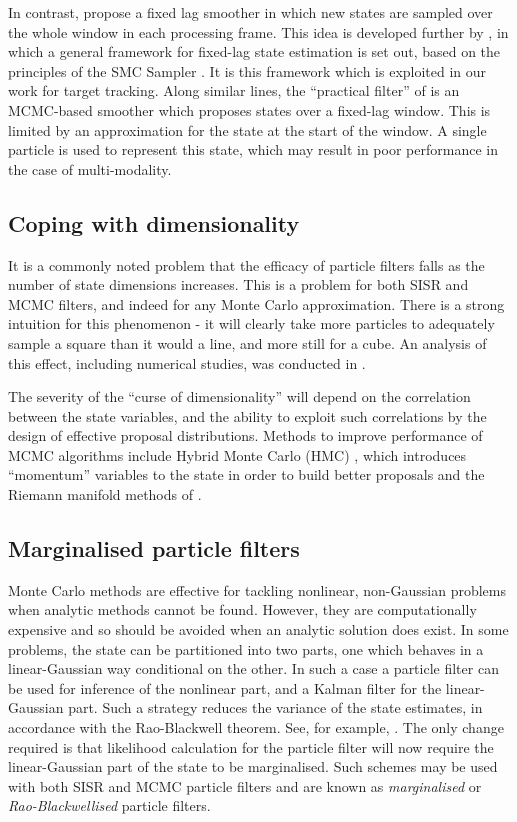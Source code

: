 In contrast, \cite{Pitt2001} propose a fixed lag smoother in which new states are sampled over the whole window in each processing frame. This idea is developed further by \cite{Doucet2006}, in which a general framework for fixed-lag state estimation is set out, based on the principles of the SMC Sampler \cite{DelMoral2006}. It is this framework which is exploited in our work for target tracking. Along similar lines, the ``practical filter'' of \cite{Polson2008} is an MCMC-based smoother which proposes states over a fixed-lag window. This is limited by an approximation for the state at the start of the window. A single particle is used to represent this state, which may result in poor performance in the case of multi-modality.



\subsection{Coping with dimensionality}
It is a commonly noted problem that the efficacy of particle filters falls as the number of state dimensions increases. This is a problem for both SISR and MCMC filters, and indeed for any Monte Carlo approximation. There is a strong intuition for this phenomenon - it will clearly take more particles to adequately sample a square than it would a line, and more still for a cube. An analysis of this effect, including numerical studies, was conducted in \cite{Daum2003}.

The severity of the ``curse of dimensionality'' will depend on the correlation between the state variables, and the ability to exploit such correlations by the design of effective proposal distributions. Methods to improve performance of MCMC algorithms include Hybrid Monte Carlo (HMC) \cite{Duane1987}, which introduces ``momentum'' variables to the state in order to build better proposals and the Riemann manifold methods of \cite{Girolami2011}.



\subsection{Marginalised particle filters}
Monte Carlo methods are effective for tackling nonlinear, non-Gaussian problems when analytic methods cannot be found. However, they are computationally expensive and so should be avoided when an analytic solution does exist. In some problems, the state can be partitioned into two parts, one which behaves in a linear-Gaussian way conditional on the other. In such a case a particle filter can be used for inference of the nonlinear part, and a Kalman filter for the linear-Gaussian part. Such a strategy reduces the variance of the state estimates, in accordance with the Rao-Blackwell theorem. See, for example, \cite{Casella1996}. The only change required is that likelihood calculation for the particle filter will now require the linear-Gaussian part of the state to be marginalised. Such schemes may be used with both SISR and MCMC particle filters and are known as \emph{marginalised} or \emph{Rao-Blackwellised} particle filters.
